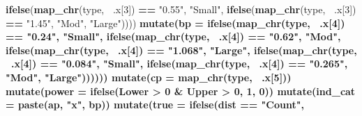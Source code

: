 \documentclass[]{DissertateUSU}
\newenvironment{Shaded}{\begin{snugshade}}{\end{snugshade}}
\newcommand{\KeywordTok}[1]{\textcolor[rgb]{0.13,0.29,0.53}{\textbf{#1}}}
\newcommand{\DataTypeTok}[1]{\textcolor[rgb]{0.13,0.29,0.53}{#1}}
\newcommand{\DecValTok}[1]{\textcolor[rgb]{0.00,0.00,0.81}{#1}}
\newcommand{\StringTok}[1]{\textcolor[rgb]{0.31,0.60,0.02}{#1}}
\newcommand{\OperatorTok}[1]{\textcolor[rgb]{0.81,0.36,0.00}{\textbf{#1}}}
\newcommand{\NormalTok}[1]{#1}
\begin{document}
\begin{Shaded}
\begin{Highlighting}[]
{{{{{{{{{{{{{{{{{{{{{{                         \KeywordTok{ifelse}\NormalTok{(}\KeywordTok{map_chr}\NormalTok{(type, }\OperatorTok{~}\NormalTok{.x[}\DecValTok{3}\NormalTok{]) }\OperatorTok{==}\StringTok{ "0.55"}\NormalTok{, }\StringTok{"Small"}\NormalTok{,}
                         \KeywordTok{ifelse}\NormalTok{(}\KeywordTok{map_chr}\NormalTok{(type, }\OperatorTok{~}\NormalTok{.x[}\DecValTok{3}\NormalTok{]) }\OperatorTok{==}\StringTok{ "1.45"}\NormalTok{, }\StringTok{"Mod"}\NormalTok{, }
                                \StringTok{"Large"}\NormalTok{)))) }\OperatorTok{%>%}
\StringTok{    }\KeywordTok{mutate}\NormalTok{(}\DataTypeTok{bp   =} \KeywordTok{ifelse}\NormalTok{(}\KeywordTok{map_chr}\NormalTok{(type, }\OperatorTok{~}\NormalTok{.x[}\DecValTok{4}\NormalTok{]) }\OperatorTok{==}\StringTok{ "0.24"}\NormalTok{, }\StringTok{"Small"}\NormalTok{,}
                  \KeywordTok{ifelse}\NormalTok{(}\KeywordTok{map_chr}\NormalTok{(type, }\OperatorTok{~}\NormalTok{.x[}\DecValTok{4}\NormalTok{]) }\OperatorTok{==}\StringTok{ "0.62"}\NormalTok{, }\StringTok{"Mod"}\NormalTok{, }
                  \KeywordTok{ifelse}\NormalTok{(}\KeywordTok{map_chr}\NormalTok{(type, }\OperatorTok{~}\NormalTok{.x[}\DecValTok{4}\NormalTok{]) }\OperatorTok{==}\StringTok{ "1.068"}\NormalTok{, }\StringTok{"Large"}\NormalTok{,}
                  \KeywordTok{ifelse}\NormalTok{(}\KeywordTok{map_chr}\NormalTok{(type, }\OperatorTok{~}\NormalTok{.x[}\DecValTok{4}\NormalTok{]) }\OperatorTok{==}\StringTok{ "0.084"}\NormalTok{, }\StringTok{"Small"}\NormalTok{,}
                  \KeywordTok{ifelse}\NormalTok{(}\KeywordTok{map_chr}\NormalTok{(type, }\OperatorTok{~}\NormalTok{.x[}\DecValTok{4}\NormalTok{]) }\OperatorTok{==}\StringTok{ "0.265"}\NormalTok{, }\StringTok{"Mod"}\NormalTok{, }
                         \StringTok{"Large"}\NormalTok{)))))) }\OperatorTok{%>%}
\StringTok{    }\KeywordTok{mutate}\NormalTok{(}\DataTypeTok{cp   =} \KeywordTok{map_chr}\NormalTok{(type, }\OperatorTok{~}\NormalTok{.x[}\DecValTok{5}\NormalTok{])) }\OperatorTok{%>%}
\StringTok{    }\KeywordTok{mutate}\NormalTok{(}\DataTypeTok{power =} \KeywordTok{ifelse}\NormalTok{(Lower }\OperatorTok{>}\StringTok{ }\DecValTok{0} \OperatorTok{&}\StringTok{ }\NormalTok{Upper }\OperatorTok{>}\StringTok{ }\DecValTok{0}\NormalTok{, }\DecValTok{1}\NormalTok{, }\DecValTok{0}\NormalTok{)) }\OperatorTok{%>%}
\StringTok{    }\KeywordTok{mutate}\NormalTok{(}\DataTypeTok{ind_cat =} \KeywordTok{paste}\NormalTok{(ap, }\StringTok{"x"}\NormalTok{, bp)) }\OperatorTok{%>%}
\StringTok{    }\KeywordTok{mutate}\NormalTok{(}\DataTypeTok{true  =} \KeywordTok{ifelse}\NormalTok{(dist }\OperatorTok{==}\StringTok{ "Count"}\NormalTok{, }
}}}}}}}}}}}}}}}}}}}}}}}}}}}
\end{Highlighting}
\end{Shaded}
\end{document}
